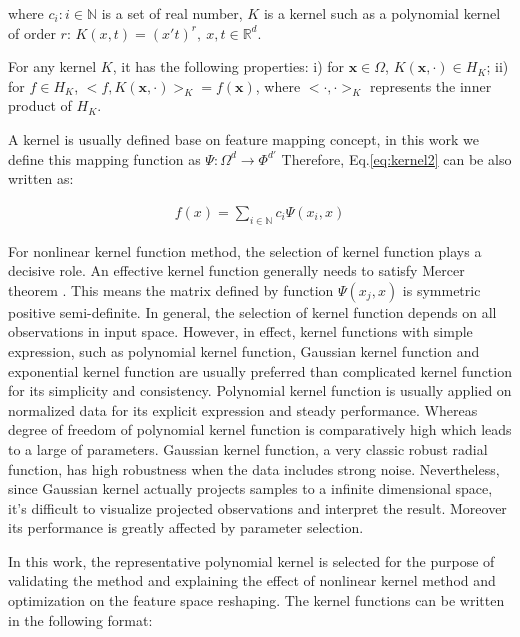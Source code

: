 where ${c_i: i \in \mathbb{N}}$ is a set of real number, $K$ is a kernel such as a polynomial kernel of order $r$: $K(x,t)=(x't)^r,~x,t\in \mathbb{R}^d$.

For any kernel $K$, it has the following properties: i) for $\mathbf{x} \in \Omega$, $K(\mathbf{x},\cdot)\in H_K$; ii) for $f\in H_K$, $<f,K(\mathbf{x},\cdot)>_K = f(\mathbf{x})$, where $<\cdot,\cdot>_K$ represents the inner product of $H_K$\cite{aronszajn1950theory}.

A kernel is usually defined base on feature mapping concept, in this work we define this mapping function as $\Psi:\Omega^d\to \Phi^{d'}$ %
Therefore, Eq.\ref{eq:kernel2} can be also written as:

\begin{align}
    f(x) = \sum_{i\in \mathbb{N}}c_i \Psi(x_i,x)
\end{align}

For nonlinear kernel function method, the selection of kernel function plays a decisive role. An effective kernel function generally needs to satisfy Mercer theorem \cite{cristianini2000introduction}. This means the matrix defined by function $\Psi(x_j,x)$ is symmetric positive semi-definite. In general, the selection of kernel function depends on all observations in input space. However, in effect, kernel functions with simple expression, such as polynomial kernel function, Gaussian kernel function and exponential kernel function are usually preferred than complicated kernel function for its simplicity and consistency. Polynomial kernel function is usually applied on normalized data for its explicit expression and steady performance. Whereas degree of freedom of polynomial kernel function is comparatively high which leads to a large of parameters. Gaussian kernel function, a very classic robust radial function, has high robustness when the data includes strong noise. Nevertheless, since Gaussian kernel actually projects samples to a infinite dimensional space, it's difficult to visualize projected observations and interpret the result. Moreover its performance is greatly affected by parameter selection.

In this work, the representative polynomial kernel is selected for the purpose of validating the method and explaining the effect of nonlinear kernel method and optimization on the feature space reshaping. The kernel functions can be written in the following format:

